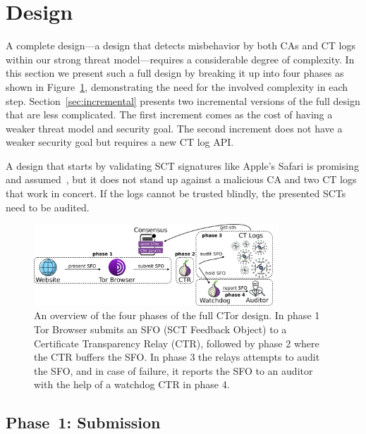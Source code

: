 \section{Design} \label{sec:base}

A complete design---a design that detects misbehavior by both CAs and CT logs
within our strong threat model---requires a considerable degree of
complexity. In this section we present such a full design by breaking it up
into four phases as shown in Figure~\ref{fig:design}, demonstrating the need for
the involved complexity in each step.  Section~\ref{sec:incremental} presents
two incremental versions of the full design that are less complicated.  The
first increment comes as the cost of having a weaker threat model and security
goal.  The second increment does not have a weaker security goal but requires a
new CT log API.

A design that starts by validating SCT signatures like Apple's Safari is
promising and assumed~\cite{safari-policy,apple-on-independence}, but it does
not stand up against a malicious CA and two CT logs that work in concert.  If
the logs cannot be trusted blindly, the presented SCTs need to be audited.

\begin{figure}
    \centering
	\includegraphics[width=0.8\textwidth]{img/design-full}
	\vspace{-8px}
	\caption{%
		An overview of the four phases of the full CTor design. In phase 1 Tor
	Browser submits an SFO (SCT Feedback Object) to a Certificate Transparency
	Relay (CTR), followed by phase 2 where the CTR buffers the SFO. In phase 3
	the relays attempts to audit the SFO, and in case of failure, it reports the
	SFO to an auditor with the help of a watchdog CTR in phase 4.}
	\label{fig:design}
	\vspace{-10px}
\end{figure}

\subsection{Phase~1: Submission} \label{sec:base:phase1}

